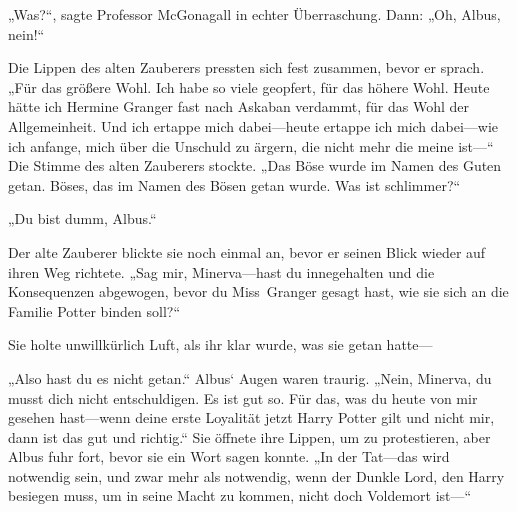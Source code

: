 „Was?“, sagte Professor McGonagall in echter Überraschung. Dann: „Oh, Albus, nein!“

Die Lippen des alten Zauberers pressten sich fest zusammen, bevor er sprach.
„Für das größere Wohl. Ich habe so viele geopfert, für das höhere Wohl. Heute hätte ich Hermine Granger fast nach Askaban verdammt, für das Wohl der Allgemeinheit. Und ich ertappe mich dabei—heute ertappe ich mich dabei—wie ich anfange, mich über die Unschuld zu ärgern, die nicht mehr die meine ist—“
Die Stimme des alten Zauberers stockte.
„Das Böse wurde im Namen des Guten getan. Böses, das im Namen des Bösen getan wurde. Was ist schlimmer?“

„Du bist dumm, Albus.“

Der alte Zauberer blickte sie noch einmal an, bevor er seinen Blick wieder auf ihren Weg richtete. „Sag mir, Minerva—hast du innegehalten und die Konsequenzen abgewogen, bevor du Miss~Granger gesagt hast, wie sie sich an die Familie Potter binden soll?“

Sie holte unwillkürlich Luft, als ihr klar wurde, was sie getan hatte—

„Also hast du es nicht getan.“ Albus‘ Augen waren traurig. „Nein, Minerva, du musst dich nicht entschuldigen. Es ist gut so. Für das, was du heute von mir gesehen hast—wenn deine erste Loyalität jetzt Harry Potter gilt und nicht mir, dann ist das gut und richtig.“
Sie öffnete ihre Lippen, um zu protestieren, aber Albus fuhr fort, bevor sie ein Wort sagen konnte. „In der Tat—das wird notwendig sein, und zwar mehr als notwendig, wenn der Dunkle Lord, den Harry besiegen muss, um in seine Macht zu kommen, nicht doch Voldemort ist—“

